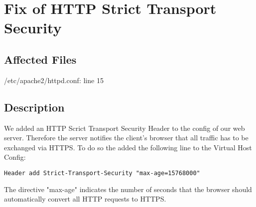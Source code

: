 \chapter{Fix of HTTP Strict Transport Security}
\section{Affected Files}

/etc/apache2/httpd.conf: line 15

\section{Description}

We added an HTTP Scrict Transport Security Header to the config of our web server. Therefore the server notifies the client's browser that all traffic has to be exchanged via HTTPS.
To do so the added the following line to the Virtual Host Config:
\begin{lstlisting}[caption = Command for enabling HSTS]
	Header add Strict-Transport-Security "max-age=15768000"
\end{lstlisting}
The directive "max-age" indicates the number of seconds that the browser should automatically convert all HTTP requests to HTTPS.
